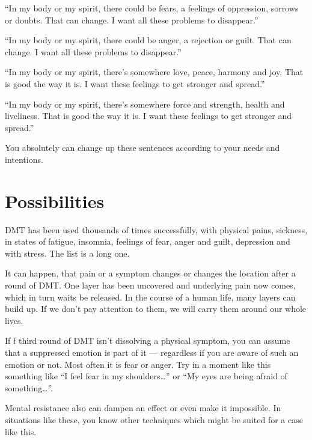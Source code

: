 \documentclass[../main.tex]{subfiles}
\begin{document}
``In my body or my spirit, there could be fears, a feelings of oppression, sorrows or doubts. That can change. I want all these problems to disappear.''

``In my body or my spirit, there could be anger, a rejection or guilt. That can change. I want all these problems to disappear.''

``In my body or my spirit, there's somewhere love, peace, harmony and joy. That is good the way it is. I want these feelings to get stronger and spread.''

``In my body or my spirit, there's somewhere force and strength, health and liveliness. That is good the way it is. I want these feelings to get stronger and spread.''

You absolutely can change up these sentences according to your needs and intentions.

\section{Possibilities}

DMT has been used thousands of times successfully, with physical pains, sickness, in states of fatigue,
insomnia, feelings of fear, anger and guilt, depression and
with stress. The list is a long one.

It can happen, that pain or a symptom changes or changes the location after a round of DMT.
One layer has been uncovered and underlying pain now comes, which in turn waits be released.
In the course of a human life, many layers can build up.
If we don't pay attention to them, we will carry them around our whole lives.

If f third round of DMT isn't dissolving a physical symptom, you can assume that a suppressed emotion is part of it --- regardless if you are aware of such an emotion or not.
Most often it is fear or anger.
Try in a moment like this something like ``I feel fear in my shoulders\ldots'' or ``My eyes are being afraid of something\ldots''.

Mental resistance also can dampen an effect or even make it impossible. In situations like these, you know other techniques which might be suited for a case like this.
\end{document}
